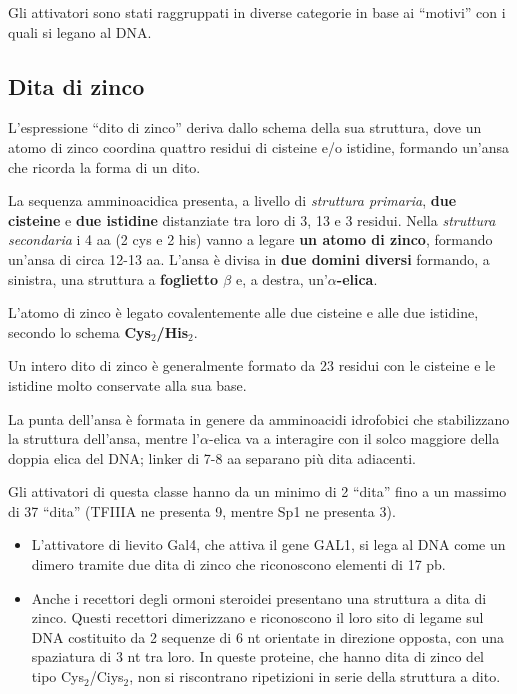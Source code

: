 \documentclass[11pt]{book}
\begin{document}
Gli attivatori sono stati raggruppati in diverse categorie in base ai
``motivi'' con i quali si legano al DNA.

\subsection{Dita di zinco}\label{dita-di-zinco}

L'espressione ``dito di zinco'' deriva dallo schema della sua struttura,
dove un atomo di zinco coordina quattro residui di cisteine e/o
istidine, formando un'ansa che ricorda la forma di un dito.

La sequenza amminoacidica presenta, a livello di \emph{struttura
primaria}, \textbf{due cisteine} e \textbf{due istidine} distanziate tra
loro di 3, 13 e 3 residui. Nella \emph{struttura secondaria} i 4 aa (2
cys e 2 his) vanno a legare \textbf{un atomo di zinco}, formando un'ansa
di circa 12-13 aa. L'ansa è divisa in \textbf{due domini diversi}
formando, a sinistra, una struttura a \textbf{foglietto \(\beta\)} e, a
destra, un'\textbf{\(\alpha\)-elica}.

L'atomo di zinco è legato covalentemente alle due cisteine e alle due
istidine, secondo lo schema \textbf{Cys\(_2\)/His\(_2\)}.

Un intero dito di zinco è generalmente formato da 23 residui con le
cisteine e le istidine molto conservate alla sua base.

La punta dell'ansa è formata in genere da amminoacidi idrofobici che
stabilizzano la struttura dell'ansa, mentre l'\(\alpha\)-elica va a
interagire con il solco maggiore della doppia elica del DNA; linker di
7-8 aa separano più dita adiacenti.

Gli attivatori di questa classe hanno da un minimo di 2 ``dita'' fino a
un massimo di 37 ``dita'' (TFIIIA ne presenta 9, mentre Sp1 ne presenta
3).

\begin{itemize}
\item
  L'attivatore di lievito Gal4, che attiva il gene GAL1, si lega al DNA
  come un dimero tramite due dita di zinco che riconoscono elementi di
  17 pb.
\item
  Anche i recettori degli ormoni steroidei presentano una struttura a
  dita di zinco. Questi recettori dimerizzano e riconoscono il loro sito
  di legame sul DNA costituito da 2 sequenze di 6 nt orientate in
  direzione opposta, con una spaziatura di 3 nt tra loro. In queste
  proteine, che hanno dita di zinco del tipo Cys\(_2\)/Ciys\(_2\), non
  si riscontrano ripetizioni in serie della struttura a dito.
\end{itemize}
\end{document}
